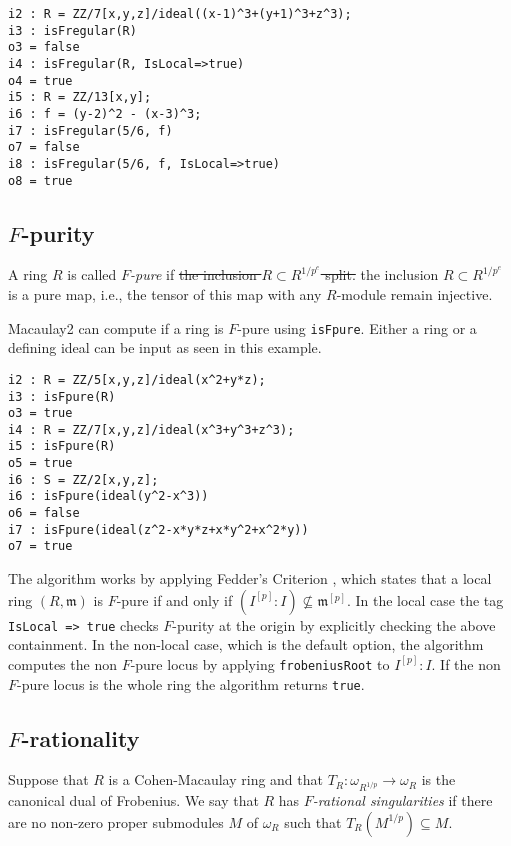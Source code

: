 \documentclass[11pt]{amsart}
\begin{document}
\begin{verbatim}
i2 : R = ZZ/7[x,y,z]/ideal((x-1)^3+(y+1)^3+z^3);
i3 : isFregular(R)
o3 = false
i4 : isFregular(R, IsLocal=>true)
o4 = true
i5 : R = ZZ/13[x,y];
i6 : f = (y-2)^2 - (x-3)^3;
i7 : isFregular(5/6, f)
o7 = false
i8 : isFregular(5/6, f, IsLocal=>true)
o8 = true
\end{verbatim}

\subsection{$F$-purity}
\begin{definition}
A ring $R$ is called \emph{$F$-pure} if 
\sout{the inclusion $R \subset R^{1/p^{e}}$ split.}
the inclusion $R \subset R^{1/p^{e}}$ is a pure map, i.e.,
the tensor of this map with any $R$-module remain injective.
\end{definition}

Macaulay2 can compute if a ring is $F$-pure using \texttt{isFpure}. Either a
ring or a defining ideal can be input as seen in this example.


\begin{verbatim}
i2 : R = ZZ/5[x,y,z]/ideal(x^2+y*z);
i3 : isFpure(R)
o3 = true
i4 : R = ZZ/7[x,y,z]/ideal(x^3+y^3+z^3);
i5 : isFpure(R)
o5 = true
i6 : S = ZZ/2[x,y,z];
i6 : isFpure(ideal(y^2-x^3))
o6 = false
i7 : isFpure(ideal(z^2-x*y*z+x*y^2+x^2*y))
o7 = true
\end{verbatim}


The algorithm works by applying Fedder's Criterion {\cite{FedderFPureRat}}, which states that a
local ring $(R, \mathfrak{m})$ is $F$-pure if and only if $(I^{[p]} : I)
\not\subseteq \mathfrak{m}^{[p]}$. In the local case the tag \texttt{IsLocal
=> true} checks $F$-purity at the origin by explicitly checking the above
containment. In the non-local case, which is the default option, the
algorithm computes the non $F$-pure locus by applying \texttt{frobeniusRoot}
to $I^{[p]} :I$. If the non $F$-pure locus is the whole ring the algorithm
returns \texttt{true}.

\subsection{$F$-rationality}

\begin{definition}
Suppose that $R$ is a Cohen-Macaulay ring and that $T_{R} :
\omega_{R^{1/p}} \rightarrow \omega_{R}$ is the canonical dual of
Frobenius. We say that $R$ has \emph{$F$-rational singularities} if there
are no non-zero proper submodules $M$ of $\omega_{R}$ such that
$T_{R}(M^{1/p}) \subseteq M$.
\end{definition}
\end{document}
